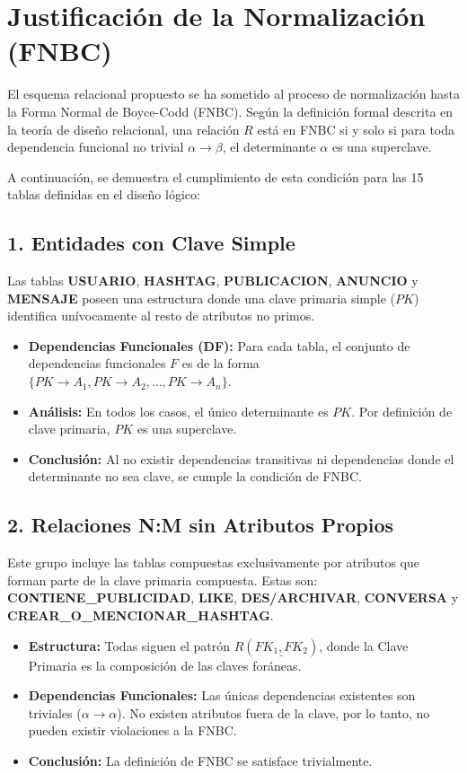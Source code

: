 
\section{Justificación de la Normalización (FNBC)}

El esquema relacional propuesto se ha sometido al proceso de normalización hasta la Forma Normal de Boyce-Codd (FNBC). Según la definición formal descrita en la teoría de diseño relacional, una relación $R$ está en FNBC si y solo si para toda dependencia funcional no trivial $\alpha \to \beta$, el determinante $\alpha$ es una superclave.

A continuación, se demuestra el cumplimiento de esta condición para las 15 tablas definidas en el diseño lógico:

\subsection*{1. Entidades con Clave Simple}
Las tablas \textbf{USUARIO}, \textbf{HASHTAG}, \textbf{PUBLICACION}, \textbf{ANUNCIO} y \textbf{MENSAJE} poseen una estructura donde una clave primaria simple ($PK$) identifica unívocamente al resto de atributos no primos.

\begin{itemize}
    \item \textbf{Dependencias Funcionales (DF):} Para cada tabla, el conjunto de dependencias funcionales $F$ es de la forma $\{PK \to A_1, PK \to A_2, \dots, PK \to A_n\}$.
    \item \textbf{Análisis:} En todos los casos, el único determinante es $PK$. Por definición de clave primaria, $PK$ es una superclave.
    \item \textbf{Conclusión:} Al no existir dependencias transitivas ni dependencias donde el determinante no sea clave, se cumple la condición de FNBC.
\end{itemize}

\subsection*{2. Relaciones N:M sin Atributos Propios}
Este grupo incluye las tablas compuestas exclusivamente por atributos que forman parte de la clave primaria compuesta. Estas son: 
\textbf{CONTIENE\_PUBLICIDAD}, \textbf{LIKE}, \textbf{DES/ARCHIVAR}, \textbf{CONVERSA} y \textbf{CREAR\_O\_MENCIONAR\_HASHTAG}.

\begin{itemize}
    \item \textbf{Estructura:} Todas siguen el patrón $R(\underline{FK_1, FK_2})$, donde la Clave Primaria es la composición de las claves foráneas.
    \item \textbf{Dependencias Funcionales:} Las únicas dependencias existentes son triviales ($\alpha \to \alpha$). No existen atributos fuera de la clave, por lo tanto, no pueden existir violaciones a la FNBC.
    \item \textbf{Conclusión:} La definición de FNBC se satisface trivialmente.
\end{itemize}

